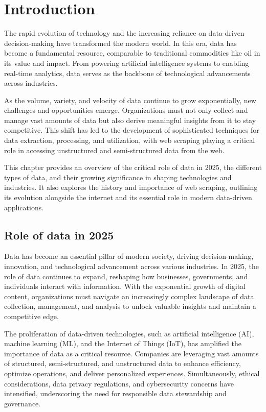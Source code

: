 \chapter{Introduction}
The rapid evolution of technology and the increasing reliance on data-driven decision-making have transformed the modern world. In this era, data has become a fundamental resource, comparable to traditional commodities like oil in its value and impact. From powering artificial intelligence systems to enabling real-time analytics, data serves as the backbone of technological advancements across industries.

As the volume, variety, and velocity of data continue to grow exponentially, new challenges and opportunities emerge. Organizations must not only collect and manage vast amounts of data but also derive meaningful insights from it to stay competitive. This shift has led to the development of sophisticated techniques for data extraction, processing, and utilization, with web scraping playing a critical role in accessing unstructured and semi-structured data from the web.

This chapter provides an overview of the critical role of data in 2025, the different types of data, and their growing significance in shaping technologies and industries. It also explores the history and importance of web scraping, outlining its evolution alongside the internet and its essential role in modern data-driven applications.
\section{Role of data in  2025}
Data has become an essential pillar of modern society, driving decision-making, innovation, and technological advancement across various industries. In 2025, the role of data continues to expand, reshaping how businesses, governments, and individuals interact with information. With the exponential growth of digital content, organizations must navigate an increasingly complex landscape of data collection, management, and analysis to unlock valuable insights and maintain a competitive edge.

The proliferation of data-driven technologies, such as artificial intelligence (AI), machine learning (ML), and the Internet of Things (IoT), has amplified the importance of data as a critical resource. Companies are leveraging vast amounts of structured, semi-structured, and unstructured data to enhance efficiency, optimize operations, and deliver personalized experiences. Simultaneously, ethical considerations, data privacy regulations, and cybersecurity concerns have intensified, underscoring the need for responsible data stewardship and governance.

